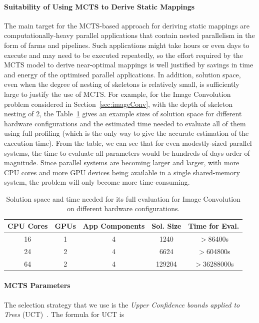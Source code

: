 \documentclass[smallextended]{svjour3}
\begin{document}
\noindent
\paragraph{Suitability of Using MCTS to Derive Static Mappings} The
main target for the MCTS-based approach for deriving static mappings
are computationally-heavy parallel applications that contain nested
parallelism in the form of farms and pipelines. Such applications
might take hours or even days to execute and may need to be executed
repeatedly, so the effort required by the MCTS model to derive
near-optimal mappings is well justified by savings in time and energy
of the optimised parallel applications. In addition, solution space,
even when the degree of nesting of skeletons is relatively small, is
sufficiently large to justify the use of MCTS. For example, for the
Image Convolution problem considered in Section~\ref{sec:imageConv},
with the depth of skeleton nesting of 2, the Table~\ref{tab:conv}
gives an example sizes of solution space for different hardware
configurations and the estimated time needed to evaluate all of them
using full profiling (which is the only way to give the accurate
estimation of the execution time). From the table, we can see that for
even modestly-sized parallel systems, the time to evaluate all
parameters would be hundreds of days order of magnitude. Since
parallel systems are becoming larger and larger, with more CPU cores
and more GPU devices being available in a single shared-memory system,
the problem will only become more time-consuming.

\begin{table}
  \begin{tabular}{|c|c|c|c|c|}
    \hline \hline
    \textbf{CPU Cores} & \textbf{GPUs} & \textbf{App Components} &
    \textbf{Sol. Size} & \textbf{Time for Eval.} \\
    \hline
    16 & 1 & 4 & 1240 & $>$86400s \\ \hline
    24 & 2 & 4 &6624 & $>$604800s \\ \hline
    64 & 2 & 4 & 129204 & $>$36288000s \\
    \hline \hline
  \end{tabular}
  \caption{Solution space and time needed for its full evaluation for
  Image Convolution on different hardware configurations.}
  \label{tab:conv}
\end{table}

\paragraph{MCTS Parameters} The selection strategy that we use is the \emph{Upper Confidence bounds applied to Trees} (UCT)~\cite{kocsis2006improved}.
The formula for UCT is
\end{document}
